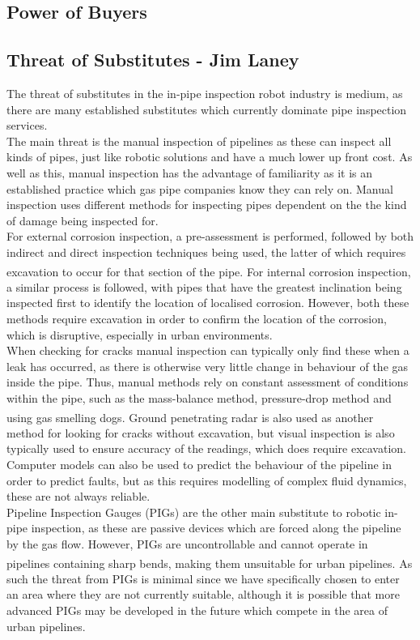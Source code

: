 \documentclass[11pt]{article}		%
\begin{document}
		
		\subsection[Power of Buyers]{Power of Buyers}
		
		\subsection[Threat of Substitutes]{Threat of Substitutes - Jim Laney}
			
			The threat of substitutes in the in-pipe inspection robot industry is medium, as there are many established substitutes which currently dominate pipe inspection services.
			\\
			The main threat is the manual inspection of pipelines as these can inspect all kinds of pipes, just like robotic solutions and have a much lower up front cost.
			As well as this, manual inspection has the advantage of familiarity as it is an established practice which gas pipe companies know they can rely on.
			Manual inspection uses different methods for inspecting pipes dependent on the the kind of damage being inspected for.
			\\
			For external corrosion inspection, a pre-assessment is performed, followed by both indirect and direct inspection techniques being used, the latter of which requires excavation to occur for that section of the pipe\textsuperscript{\cite{kishawy2010review}}. 
			For internal corrosion inspection, a similar process is followed, with pipes that have the greatest inclination being inspected first to identify the location of localised corrosion. 
			However, both these methods require excavation in order to confirm the location of the corrosion, which is disruptive, especially in urban environments.
			\\
			When checking for cracks manual inspection can typically only find these when a leak has occurred, as there is otherwise very little change in behaviour of the gas inside the pipe.
			Thus, manual methods rely on constant assessment of conditions within the pipe, such as the mass-balance method, pressure-drop method and using gas smelling dogs\textsuperscript{\cite{kishawy2010review}}.
			Ground penetrating radar is also used as another method for looking for cracks without excavation, but visual inspection is also typically used to ensure accuracy of the readings, which does require excavation.
			Computer models can also be used to predict the behaviour of the pipeline in order to predict faults, but as this requires modelling of complex fluid dynamics, these are not always reliable.
			\\
			Pipeline Inspection Gauges (PIGs) are the other main substitute to robotic in-pipe inspection, as these are passive devices which are forced along the pipeline by the gas flow.
			However, PIGs are uncontrollable and cannot operate in pipelines containing sharp bends\textsuperscript{\cite{mills2017advances}}, making them unsuitable for urban pipelines.
			As such the threat from PIGs is minimal since we have specifically chosen to enter an area where they are not currently suitable, although it is possible that more advanced PIGs may be developed in the future which compete in the area of urban pipelines.
		
\end{document}
